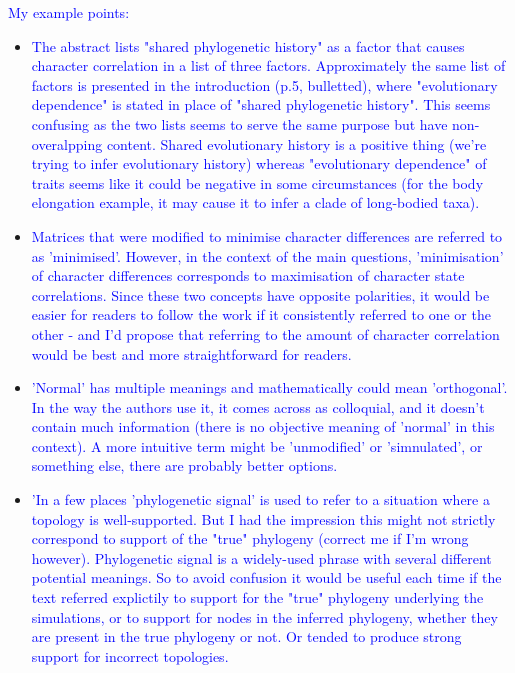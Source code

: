 \documentclass[12pt,letterpaper]{article}
\begin{document}
\textcolor{blue}{My example points:}

\begin{itemize}

\item{\textcolor{blue}{The abstract lists "shared phylogenetic history" as a factor that causes character correlation in a list of three factors. Approximately the same list of factors is presented in the introduction (p.5, bulletted), where "evolutionary dependence" is stated in place of "shared phylogenetic history". This seems confusing as the two lists seems to serve the same purpose but have non-overalpping content. Shared evolutionary history is a positive thing (we're trying to infer evolutionary history) whereas "evolutionary dependence" of traits seems like it could be negative in some circumstances (for the body elongation example, it may cause it to infer a clade of long-bodied taxa).}}

\item{\textcolor{blue}{Matrices that were modified to minimise character differences are referred to as 'minimised'. However, in the context of the main questions, 'minimisation' of character differences corresponds to maximisation of character state correlations. Since these two concepts have opposite polarities, it would be easier for readers to follow the work if it consistently referred to one or the other - and I'd propose that referring to the amount of character correlation would be best and more straightforward for readers.}}

\item{\textcolor{blue}{'Normal' has multiple meanings and mathematically could mean 'orthogonal'. In the way the authors use it, it comes across as colloquial, and it doesn't contain much information (there is no objective meaning of 'normal' in this context). A more intuitive term might be 'unmodified' or 'simnulated', or something else, there are probably better options.}}

\item{\textcolor{blue}{'In a few places 'phylogenetic signal' is used to refer to a situation where a topology is well-supported. But I had the impression this might not strictly correspond to support of the "true" phylogeny (correct me if I'm wrong however). Phylogenetic signal is a widely-used phrase with several different potential meanings. So to avoid confusion it would be useful each time if the text referred explictily to support for the "true" phylogeny underlying the simulations, or to support for nodes in the inferred phylogeny, whether they are present in the true phylogeny or not. Or tended to produce strong support for incorrect topologies.}}

\end{itemize}
\end{document}
